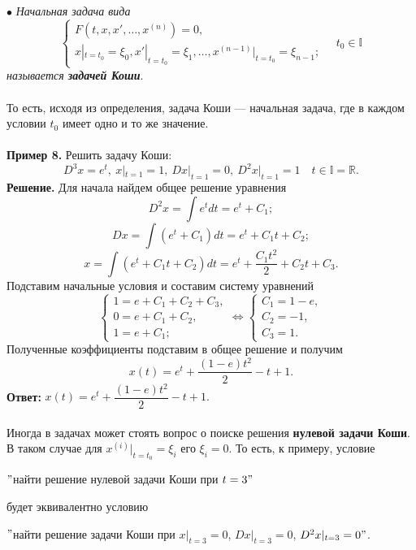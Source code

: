 \documentclass[a4paper, 12pt]{article}
\newcommand{\Rm}{\mathbb{R}}
\newcommand{\I}{\mathbb{I}}
\begin{document}
$\bullet$ \textit{Начальная задача вида $$\begin{cases} F(t, x, x', \dots, x^{(n)}) = 0,\\ x|_{t = t_0} = \xi_0, x'|_{t = t_0} = \xi_1, \dots, x^{(n-1)}|_{t = t_0} = \xi_{n-1};\end{cases}\quad t_0 \in \mathbb{I}$$ называется \textbf{задачей Коши}}.\\\\
То есть, исходя из определения, задача Коши --- начальная задача, где в каждом условии $t_0$ имеет одно и то же значение.\\\\
\textbf{Пример 8.} Решить задачу Коши:
$$D^3x = e^t,\ x|_{t=1} = 1,\ Dx|_{t = 1} = 0,\ D^2x|_{t = 1} = 1\quad t \in \I = \Rm.$$
\textbf{Решение.} Для начала найдем общее решение уравнения
$$D^2x = \int e^tdt = e^t + C_1;$$
$$Dx = \int (e^t + C_1) dt = e^t + C_1t+C_2;$$
$$x = \int (e^t + C_1t+C_2) dt = e^t + \dfrac{C_1t^2}{2} + C_2t+C_3.$$
Подставим начальные условия и составим систему уравнений
$$\begin{cases}
	1 = e + C_1 + C_2 + C_3,\\
	0 = e + C_1 + C_2,\\
	1 = e + C_1;
\end{cases}\Longleftrightarrow\begin{cases}
C_1 = 1-e,\\
C_2 = -1,\\
C_3 = 1.
\end{cases}$$
Полученные коэффициенты подставим в общее решение и получим
$$x(t) = e^t + \dfrac{(1-e)t^2}{2} - t + 1.$$
\textbf{Ответ:} $x(t) = e^t + \dfrac{(1-e)t^2}{2} - t + 1.$\\\\
Иногда в задачах может стоять вопрос о поиске решения \textbf{нулевой задачи Коши}. В таком случае для $x^{(i)}|_{t=t_0} = \xi_i$ его $\xi_i = 0$. То есть, к примеру, условие \begin{center}
	$"$найти решение нулевой задачи Коши при $t = 3"$
\end{center} будет эквивалентно условию
\begin{center}
	$"$найти решение задачи Коши при $x|_{t=3} = 0$, $Dx|_{t=3} = 0$, $D^2x|_{t=3} = 0"$.
\end{center} 
\end{document}
